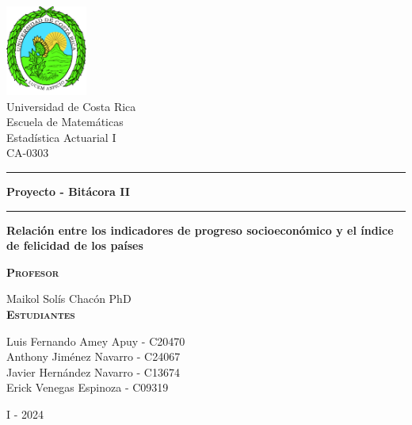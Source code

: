 \begin{titlepage}
\begin{center}
\vspace{2cm}
\includegraphics[width=0.2\textwidth]{root/Logo_ucr.png}~\\[1cm]

{\huge Universidad de Costa Rica} \\
{\large 
Escuela de Matemáticas \\
Estadística Actuarial I \\
CA-0303\\
}

\vspace{.5cm}


\hrule
\vspace{.5cm}
{ \Huge \bfseries Proyecto - Bitácora II} 
\vspace{.5cm}
\hrule
\vspace{1cm}

{\Large \textbf{Relación entre los indicadores de progreso socioeconómico y el índice de felicidad de los países}}
\vspace{1cm}

\textsc{\textbf{Profesor}}\\
\vspace{2px}

Maikol Solís Chacón PhD \\

\vspace{.5cm}
\textsc{\textbf{Estudiantes}}\\
\vspace{2px}


Luis Fernando Amey Apuy - C20470\\
\vspace{5px}
Anthony Jiménez Navarro - C24067\\
\vspace{5px}
Javier Hernández Navarro - C13674\\
\vspace{5px}
Erick Venegas Espinoza - C09319\\

\vspace{1cm}

I - 2024 \\


\end{center}
\end{titlepage}